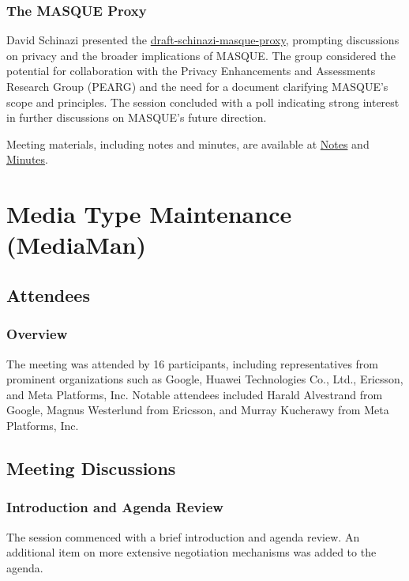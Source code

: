 \documentclass{article}
\begin{document}
\subsubsection{The MASQUE Proxy}
David Schinazi presented the \href{https://datatracker.ietf.org/doc/html/draft-schinazi-masque-proxy}{draft-schinazi-masque-proxy}, prompting discussions on privacy and the broader implications of MASQUE. The group considered the potential for collaboration with the Privacy Enhancements and Assessments Research Group (PEARG) and the need for a document clarifying MASQUE's scope and principles. The session concluded with a poll indicating strong interest in further discussions on MASQUE's future direction.

Meeting materials, including notes and minutes, are available at \href{https://notes.ietf.org/notes-ietf-122-masque}{Notes} and \href{https://datatracker.ietf.org/doc/minutes-122-masque/}{Minutes}.



\newpage

\section{Media Type Maintenance (MediaMan)}

\subsection{Attendees}
\subsubsection{Overview}
The meeting was attended by 16 participants, including representatives from prominent organizations such as Google, Huawei Technologies Co., Ltd., Ericsson, and Meta Platforms, Inc. Notable attendees included Harald Alvestrand from Google, Magnus Westerlund from Ericsson, and Murray Kucherawy from Meta Platforms, Inc.

\subsection{Meeting Discussions}

\subsubsection{Introduction and Agenda Review}
The session commenced with a brief introduction and agenda review. An additional item on more extensive negotiation mechanisms was added to the agenda.
\end{document}

